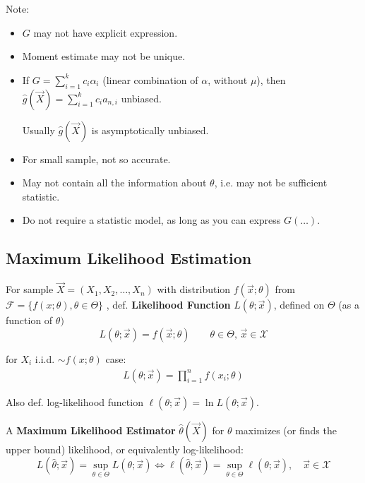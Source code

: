     \begin{point}
        Note:
    \end{point}
    
        
    \begin{itemize}
        \item $G$ may not have explicit expression.
        \item Moment estimate may not be unique.
        \item If $G={\displaystyle\sum_{i=1}^kc_i\alpha_i}$ (linear combination of $\alpha$, without $\mu$), then $\hat{g}(\vec{X})={\displaystyle\sum_{i=1}^kc_ia_{n,i}}$ unbiased.
        
        \qquad Usually $\hat{g}(\vec{X})$ is asymptotically unbiased.
        \item For small sample, not so accurate.
        \item May not contain all the information about $\theta$, i.e. may not be sufficient statistic.
        \item Do not require a statistic model, as long as you can express $ G(\ldots) $.
    \end{itemize}


\subsection{Maximum Likelihood Estimation}\label{SubSectionMLE}
    For sample $\vec{X}=(X_1,X_2,\ldots,X_n)$ with distribution $f(\vec{x};\theta)$ from $\mathscr{F}=\{f(x;\theta),\theta\in\Theta\}$ , def. \textbf{Likelihood Function} $L(\theta;\vec{x})$, defined on $\Theta$ (as a function of $\theta)$
    \begin{equation}
        L(\theta;\vec{x})=f(\vec{x};\theta)\qquad \theta\in\Theta,\,\vec{x}\in\mathscr{X}    
    \end{equation}

    for $ X_i $ i.i.d. $ \sim f(x;\theta ) $ case:
    \begin{align}
        L(\theta ;\vec{x})=\prod_{i=1}^nf (x_i;\theta )
    \end{align}
    
    

    Also def. log-likelihood function $\ell(\theta;\vec{x})=\ln L(\theta;\vec{x})$.

    A \textbf{Maximum Likelihood Estimator} $\hat{\theta}(\vec{X})$ for $ \theta  $ maximizes (or finds the upper bound) likelihood, or equivalently log-likelihood:
    \begin{equation}
        L(\hat{\theta};\vec{x})=\sup_{\theta\in\Theta}L(\theta;\vec{x})\Leftrightarrow \ell(\hat{\theta};\vec{x})=\sup_{\theta\in\Theta}\ell(\theta;\vec{x}) ,\quad \vec{x}\in\mathscr{X}
    \end{equation}


